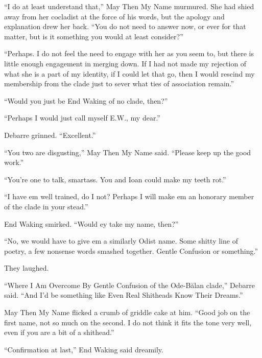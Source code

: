 ``I do at least understand that,'' May Then My Name murmured. She had shied away from her cocladist at the force of his words, but the apology and explanation drew her back. ``You do not need to answer now, or ever for that matter, but is it something you would at least consider?''

``Perhaps. I do not feel the need to engage with her as you seem to, but there is little enough engagement in merging down. If I had not made my rejection of what she is a part of my identity, if I could let that go, then I would rescind my membership from the clade just to sever what ties of association remain.''

``Would you just be End Waking of no clade, then?''

``Perhaps I would just call myself E.W., my dear.''

Debarre grinned. ``Excellent.''

``You two are disgusting,'' May Then My Name said. ``Please keep up the good work.''

``You're one to talk, smartass. You and Ioan could make my teeth rot.''

``I have em well trained, do I not? Perhaps I will make em an honorary member of the clade in your stead.''

End Waking smirked. ``Would ey take my name, then?''

``No, we would have to give em a similarly Odist name. Some shitty line of poetry, a few nonsense words smashed together. Gentle Confusion or something.''

They laughed.

``Where I Am Overcome By Gentle Confusion of the Ode-Bălan clade,'' Debarre said. ``And I'd be something like Even Real Shitheads Know Their Dreams.''

May Then My Name flicked a crumb of griddle cake at him. ``Good job on the first name, not so much on the second. I do not think it fits the tone very well, even if you are a bit of a shithead.''

``Confirmation at last,'' End Waking said dreamily.

